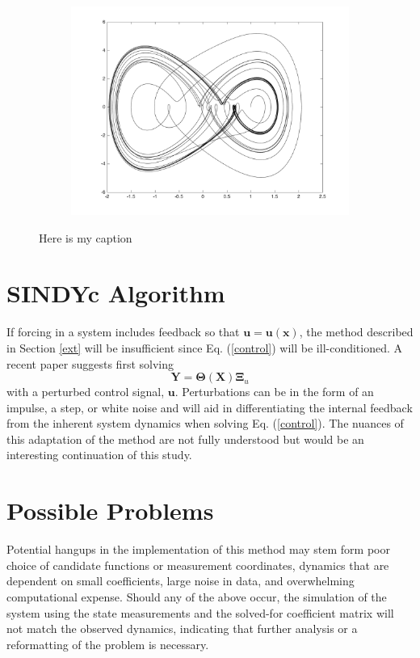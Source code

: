 \documentclass[%
 aip,12pt,
rsi,%
 amsmath,amssymb,
 reprint,%
]{revtex4-1}
\newcommand{\refe}[1]{Eq. (\ref{#1})}
\begin{document}
{\begin{figure}[t]
\begin{subfigure}{.5\textwidth}
\end{subfigure}%
\begin{subfigure}{.5\textwidth}
  \includegraphics[width=.8\linewidth]{CD_S2.png}
\end{subfigure}
\caption{Here is my caption\label{fig:CD}}
\end{figure}


\section{SINDYc Algorithm}
If forcing in a system includes feedback so that $\bm{u} = \bm{u}(\bm{x})$, the method described in Section \ref{ext} will be insufficient since \refe{control} will be ill-conditioned. A recent paper suggests first solving 
\begin{equation}
  \bm{Y} = \bm{\Theta}(\bm{X})\bm{\Xi}_u
\end{equation}
with a perturbed control signal, $\bm{u}$. Perturbations can be in the form of an impulse, a step, or white noise and will aid in differentiating the internal feedback from the inherent system dynamics when solving \refe{control}. The nuances of this adaptation of the method are not fully understood but would be an interesting continuation of this study. 


\section{Possible Problems}

Potential hangups in the implementation of this method may stem form poor choice of candidate functions or measurement coordinates, dynamics that are dependent on small coefficients, large noise in data, and overwhelming computational expense. Should any of the above occur, the simulation of the system using the state measurements and the solved-for coefficient matrix will not match the observed dynamics, indicating that further analysis or a reformatting of the problem is necessary.

}
\end{document}
